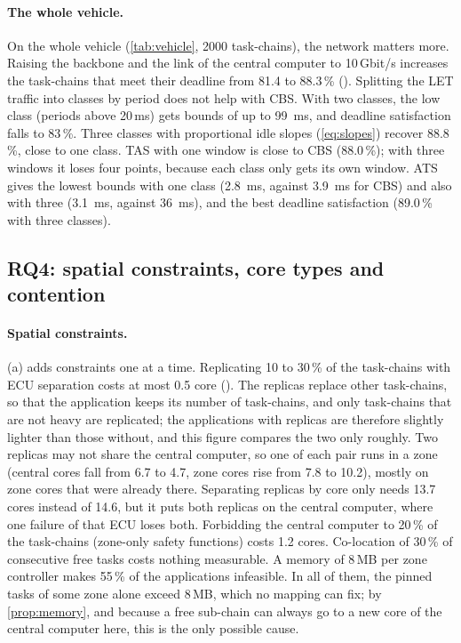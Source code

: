 

\paragraph{The whole vehicle.} On the whole vehicle (\cref{tab:vehicle},
2000 task-chains), the network matters more. Raising the backbone and the
link of the central computer to 10\,Gbit/s increases the task-chains that
meet their deadline from 81.4 to 88.3\,\% (\BFDU). Splitting the LET
traffic into classes by period does not help with CBS. With two classes,
the low class (periods above 20\,ms) gets bounds of up to \SI{99}{ms}, and
deadline satisfaction falls to 83\,\%. Three classes with proportional idle
slopes (\cref{eq:slopes}) recover 88.8\,\%, close to one class. TAS with
one window is close to CBS (88.0\,\%); with three windows it loses four
points, because each class only gets its own window. ATS gives the lowest
bounds with one class (\SI{2.8}{ms}, against \SI{3.9}{ms} for CBS) and
also with three (\SI{3.1}{ms}, against \SI{36}{ms}), and the best deadline
satisfaction (89.0\,\% with three classes).

\subsection{RQ4: spatial constraints, core types and contention}
\label{sec:rq4}

\paragraph{Spatial constraints.} (a) adds constraints
one at a time. Replicating 10 to 30\,\% of the task-chains with ECU
separation costs at most 0.5 core (\BFDU). The replicas replace other
task-chains, so that the application keeps its number of task-chains, and
only task-chains that are not heavy are replicated; the applications with
replicas are therefore slightly lighter than those without, and this
figure compares the two only roughly. Two replicas may not share the
central computer, so one of each pair runs in a zone (central cores fall
from 6.7 to 4.7, zone cores rise from 7.8 to 10.2), mostly on zone cores
that were already there. Separating replicas by core only needs 13.7 cores instead
of 14.6, but it puts both replicas on the central computer, where one
failure of that ECU loses both. Forbidding
the central computer to 20\,\% of the task-chains (zone-only safety
functions) costs 1.2 cores. Co-location of 30\,\% of consecutive free tasks
costs nothing measurable. A memory of 8\,MB per zone controller makes 55\,\%
of the applications infeasible. In all of them, the pinned tasks of some
zone alone exceed 8\,MB, which no mapping can fix; by
\cref{prop:memory}, and because a free sub-chain can always go to a new
core of the central computer here, this is the only possible cause.


